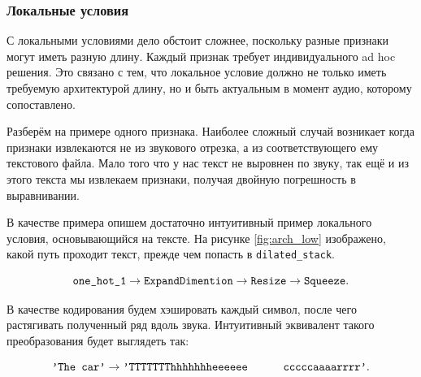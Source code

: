 \documentclass[../diploma.tex]{subfiles}
\begin{document}
\subsubsection{Локальные условия}

С локальными условиями дело обстоит сложнее, поскольку разные признаки могут иметь разную длину. Каждый признак требует индивидуального ad hoc решения. Это связано с тем, что локальное условие должно не только иметь требуемую архитектурой длину, но и быть актуальным в момент аудио, которому сопоставлено.

Разберём на примере одного признака.
Наиболее сложный случай возникает когда признаки извлекаются не из звукового отрезка, а из соответствующего ему текстового файла. Мало того что у нас текст не выровнен по звуку, так ещё и из этого текста мы извлекаем признаки, получая двойную погрешность в выравнивании.

В качестве примера опишем достаточно интуитивный пример локального условия, основывающийся на тексте.
На рисунке \ref{fig:arch_low} изображено, какой путь проходит текст, прежде чем попасть в \verb|dilated_stack|.

$$
\verb|one_hot_1| \rightarrow \verb|ExpandDimention| \rightarrow \verb|Resize| \rightarrow \verb|Squeeze|.
$$

В качестве кодирования будем хэшировать каждый символ, после чего растягивать полученный ряд вдоль звука. 
Интуитивный эквивалент такого преобразования будет выглядеть так:

$$
\verb|'The car'| \rightarrow \verb|'TTTTTTThhhhhhheeeeee      cccccaaaarrrr'|.
$$
\end{document}
